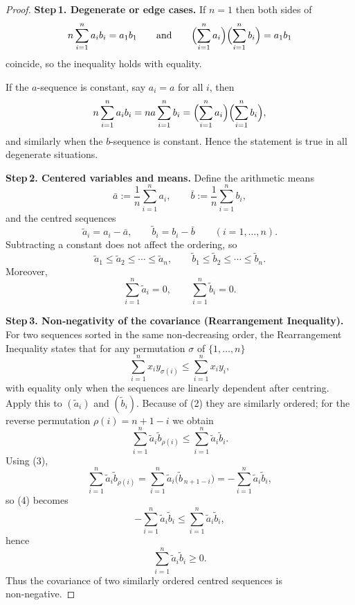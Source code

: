 \begin{proof}
\textbf{Step 1. Degenerate or edge cases.}  
If \(n=1\) then both sides of  
\[
n\sum_{i=1}^{n}a_{i}b_{i}=a_{1}b_{1}
\qquad\text{and}\qquad
\Bigl(\sum_{i=1}^{n}a_{i}\Bigr)\Bigl(\sum_{i=1}^{n}b_{i}\Bigr)=a_{1}b_{1}
\]
coincide, so the inequality holds with equality.  

If the \(a\)-sequence is constant, say \(a_{i}=a\) for all \(i\), then
\[
n\sum_{i=1}^{n}a_{i}b_{i}=na\sum_{i=1}^{n}b_{i}
   =\Bigl(\sum_{i=1}^{n}a_{i}\Bigr)\Bigl(\sum_{i=1}^{n}b_{i}\Bigr),
\]
and similarly when the \(b\)-sequence is constant.  Hence the statement is true in all degenerate situations.

\textbf{Step 2. Centered variables and means.}  
Define the arithmetic means
\[
\bar a:=\frac{1}{n}\sum_{i=1}^{n}a_{i},\qquad
\bar b:=\frac{1}{n}\sum_{i=1}^{n}b_{i},
\]
and the centred sequences
\[
\tilde a_{i}=a_{i}-\bar a,\qquad
\tilde b_{i}=b_{i}-\bar b\qquad(i=1,\dots ,n).
\]
Subtracting a constant does not affect the ordering, so
\[
\tilde a_{1}\le\tilde a_{2}\le\cdots\le\tilde a_{n},
\qquad
\tilde b_{1}\le\tilde b_{2}\le\cdots\le\tilde b_{n}. \tag{2}
\]
Moreover,
\[
\sum_{i=1}^{n}\tilde a_{i}=0,\qquad
\sum_{i=1}^{n}\tilde b_{i}=0. \tag{3}
\]

\textbf{Step 3. Non‑negativity of the covariance (Rearrangement Inequality).}  
For two sequences sorted in the same non‑decreasing order, the Rearrangement
Inequality states that for any permutation \(\sigma\) of \(\{1,\dots ,n\}\)
\[
\sum_{i=1}^{n}x_{i}y_{\sigma(i)}\le\sum_{i=1}^{n}x_{i}y_{i},
\]
with equality only when the sequences are linearly dependent after centring.  
Apply this to \((\tilde a_{i})\) and \((\tilde b_{i})\).  Because of (2) they are similarly ordered; for the reverse permutation
\(\rho(i)=n+1-i\) we obtain
\[
\sum_{i=1}^{n}\tilde a_{i}\tilde b_{\rho(i)}\le\sum_{i=1}^{n}\tilde a_{i}\tilde b_{i}. \tag{4}
\]
Using (3),
\[
\sum_{i=1}^{n}\tilde a_{i}\tilde b_{\rho(i)}
   =\sum_{i=1}^{n}\tilde a_{i}\bigl(\tilde b_{\,n+1-i}\bigr)
   =-\sum_{i=1}^{n}\tilde a_{i}\tilde b_{i},
\]
so (4) becomes
\[
-\sum_{i=1}^{n}\tilde a_{i}\tilde b_{i}\le\sum_{i=1}^{n}\tilde a_{i}\tilde b_{i},
\]
hence
\[
\boxed{\displaystyle\sum_{i=1}^{n}\tilde a_{i}\tilde b_{i}\ge0}. \tag{5}
\]
Thus the covariance of two similarly ordered centred sequences is non‑negative.


\end{proof}

